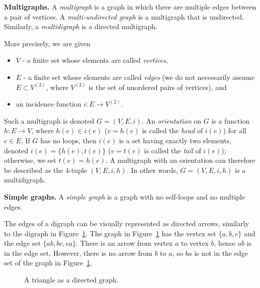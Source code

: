 \begin{definition}
\textbf{Multigraphs.}
A \emph{multigraph} is a graph in which there are multiple edges
between a pair of vertices. A \emph{multi-undirected graph} is a
multigraph that is undirected. Similarly, a \emph{multidigraph} is a
directed multigraph.

More precisely, we are given

\begin{itemize}
\item
$V$ - a finite set whose elements are called {\it vertices}, 
\item
$E$ - a finite set whose elements are called {\it edges}
(we do not necessarily assume $E\subset V^{(2)}$,
where $V^{(2)}$ is the set of unordered pairs of
vertices), and 
\item
an incidence function $i:E\to V^{(2)}$.
\end{itemize}
Such a multigraph is denoted $G=(V,E,i)$.
An {\it orientation} on $G$ is a function
$h:E\to V$, where $h(e)\in i(e)$ ($v=h(e)$ is called the
{\it head} of $i(e)$) for all $e\in E$. If $G$ has no loops,
then $i(e)$ is a set having exactly two elements, denoted
$i(e)=\{h(e),t(e)\}$ ($v=t(e)$ is called the
{\it tail} of $i(e)$); otherwise, we set $t(e)=h(e)$.
A multigraph with an orientation can therefore be described
as the $4$-tuple $(V,E,i,h)$.
In other words, $G=(V,E,i,h)$ is a multidigraph.

\end{definition}

\begin{definition}
\textbf{Simple graphs.}
A \emph{simple graph} is a graph with no self-loops and no multiple
edges.
\end{definition}

The edges of a digraph can be visually represented as directed arrows,
similarly to the digraph in
Figure~\ref{fig:introduction:directed_triangle_graph}. The graph in
Figure~\ref{fig:introduction:directed_triangle_graph} has the vertex
set $\{ a, b, c \}$ and the edge set $\{ ab, bc, ca \}$. There is an
arrow from vertex $a$ to vertex $b$, hence $ab$ is in the edge
set. However, there is no arrow from $b$ to $a$, so $ba$ is not in the
edge set of the graph in
Figure~\ref{fig:introduction:directed_triangle_graph}.

\begin{figure}[!htbp]
\centering
{}
\caption{A triangle as a directed graph.}
\label{fig:introduction:directed_triangle_graph}
\end{figure}

